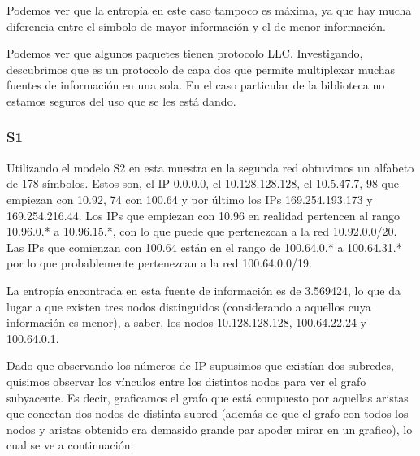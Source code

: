 Podemos ver que la entropía en este caso tampoco es máxima, ya que hay mucha 
diferencia entre el símbolo de mayor información y el de menor información.

Podemos ver que algunos paquetes tienen protocolo LLC. Investigando, descubrimos
que es un protocolo de capa dos que permite multiplexar muchas fuentes de
información en una sola. En el caso particular de la biblioteca no
estamos seguros del uso que se les está dando.

\subsubsection{S1}

Utilizando el modelo S2 en esta muestra en la segunda red obtuvimos un
alfabeto de 178 símbolos. Estos son, el IP 0.0.0.0, el 10.128.128.128,
el 10.5.47.7, 98 que empiezan con 10.92, 74 con 100.64 y por último
los IPs 169.254.193.173 y 169.254.216.44. Los IPs que empiezan con
10.96 en realidad pertencen al rango 10.96.0.* a 10.96.15.*, con lo
que puede que pertenezcan a la red 10.92.0.0/20. Las IPs que comienzan
con 100.64 están en el rango de 100.64.0.* a 100.64.31.* por lo que
probablemente pertenezcan a la red 100.64.0.0/19.

La entropía encontrada en esta fuente de información es de 3.569424,
lo que da lugar a que existen tres nodos distinguidos (considerando a
aquellos cuya información es menor), a saber, los nodos
10.128.128.128, 100.64.22.24 y 100.64.0.1.

Dado que observando los números de IP supusimos que existían dos
subredes, quisimos observar los vínculos entre los distintos nodos
para ver el grafo subyacente. Es decir, graficamos el grafo que está
compuesto por aquellas aristas que conectan dos nodos de distinta
subred (además de que el grafo con todos los nodos y aristas obtenido
era demasido grande par apoder mirar en un grafico), lo cual se ve a
continuación:

